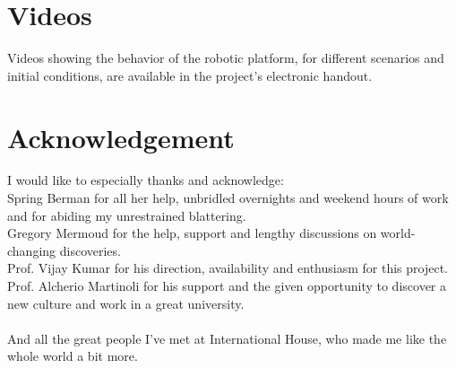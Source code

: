 \section{Videos} %
\label{sec:videos}
	Videos showing the behavior of the robotic platform, for different scenarios and initial conditions, are available in the project's electronic handout.

\section{Acknowledgement} %
\label{sec:acknowledgement}
	
	I would like to especially thanks and acknowledge:\\
	Spring Berman for all her help, unbridled overnights and weekend hours of work and for abiding my unrestrained blattering.\\
	Gregory Mermoud for the help, support and lengthy discussions on world-changing discoveries.\\
	Prof. Vijay Kumar for his direction, availability and enthusiasm for this project.\\
	Prof. Alcherio Martinoli for his support and the given opportunity to discover a new culture and work in a great university.

	\paragraph{}
	\noindent And all the great people I've met at International House, who made me like the whole world a bit more.
	
